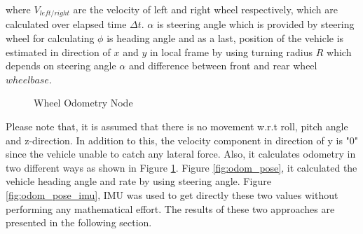 \noindent where $V_{left/right}$ are the velocity of left and right wheel respectively, which are calculated over elapsed time $\Delta t$. $\alpha$ is steering angle which is provided by steering wheel for calculating $\phi$ is heading angle and as a last,  position of the vehicle is estimated in direction of $x$ and $y$ in local frame by using turning radius $R$ which depends on steering angle $\alpha$ and difference between front and rear wheel $wheelbase$.
\vspace{-0.5cm}
\begin{figure}[H]
\centering
{}
\hspace{30pt}
\caption{Wheel Odometry Node}
\label{fig:odometry}
\end{figure}
\vspace{-0.5cm}
\par Please note that, it is assumed that there is no movement w.r.t roll, pitch angle and z-direction. In addition to this, the velocity component in direction of y is "0" since the vehicle unable to catch any lateral force. Also, it calculates odometry in two different ways as shown in Figure \ref{fig:odometry}. Figure \ref{fig:odom_pose}, it calculated the vehicle heading angle and rate by using steering angle. Figure \ref{fig:odom_pose_imu}, IMU was used to get directly these two values without performing any mathematical effort. The results of these two approaches are presented in the following section.

